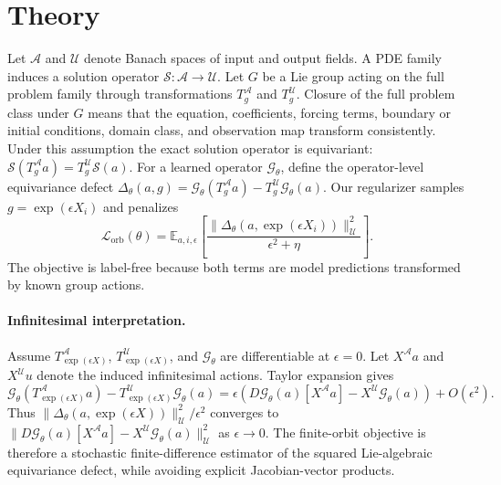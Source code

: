 \section{Theory}
\label{sec:theory}

Let \(\mathcal A\) and \(\mathcal U\) denote Banach spaces of input and output fields. A PDE family induces a solution operator \(\mathcal S:\mathcal A\to\mathcal U\). Let \(G\) be a Lie group acting on the full problem family through transformations \(T_g^{\mathcal A}\) and \(T_g^{\mathcal U}\). Closure of the full problem class under \(G\) means that the equation, coefficients, forcing terms, boundary or initial conditions, domain class, and observation map transform consistently. Under this assumption the exact solution operator is equivariant: \(\mathcal S(T_g^{\mathcal A}a)=T_g^{\mathcal U}\mathcal S(a)\). For a learned operator \(\mathcal G_\theta\), define the operator-level equivariance defect \(\Delta_\theta(a,g)=\mathcal G_\theta(T_g^{\mathcal A}a)-T_g^{\mathcal U}\mathcal G_\theta(a)\). Our regularizer samples \(g=\exp(\epsilon X_i)\) and penalizes
\begin{equation}
\mathcal L_{\mathrm{orb}}(\theta)=\mathbb E_{a,i,\epsilon}\left[\frac{\|\Delta_\theta(a,\exp(\epsilon X_i))\|_{\mathcal U}^2}{\epsilon^2+\eta}\right].
\end{equation}
The objective is label-free because both terms are model predictions transformed by known group actions.

\paragraph{Infinitesimal interpretation.} Assume \(T_{\exp(\epsilon X)}^{\mathcal A}\), \(T_{\exp(\epsilon X)}^{\mathcal U}\), and \(\mathcal G_\theta\) are differentiable at \(\epsilon=0\). Let \(X^{\mathcal A}a\) and \(X^{\mathcal U}u\) denote the induced infinitesimal actions. Taylor expansion gives
\begin{equation}
\mathcal G_\theta(T_{\exp(\epsilon X)}^{\mathcal A}a)-T_{\exp(\epsilon X)}^{\mathcal U}\mathcal G_\theta(a)=\epsilon\left(D\mathcal G_\theta(a)[X^{\mathcal A}a]-X^{\mathcal U}\mathcal G_\theta(a)\right)+O(\epsilon^2).
\end{equation}
Thus \(\|\Delta_\theta(a,\exp(\epsilon X))\|_{\mathcal U}^2/\epsilon^2\) converges to \(\|D\mathcal G_\theta(a)[X^{\mathcal A}a]-X^{\mathcal U}\mathcal G_\theta(a)\|_{\mathcal U}^2\) as \(\epsilon\to0\). The finite-orbit objective is therefore a stochastic finite-difference estimator of the squared Lie-algebraic equivariance defect, while avoiding explicit Jacobian-vector products.

